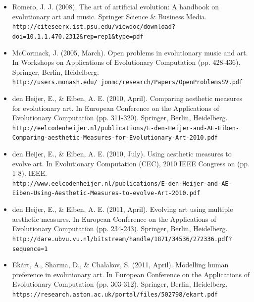 \documentclass[10pt,a4paper]{article}
\begin{document}
\begin{itemize}
	\item Romero, J. J. (2008). The art of artificial evolution: A handbook on evolutionary art and music. Springer Science \& Business Media.
	\\
	\texttt{http://citeseerx.ist.psu.edu/viewdoc/download?doi=10.1.1.470.2312\&rep=rep1\&type=pdf}
	
	\item McCormack, J. (2005, March). Open problems in evolutionary music and art. In Workshops on Applications of Evolutionary Computation (pp. 428-436). Springer, Berlin, Heidelberg.
	\\
	\texttt{http://users.monash.edu/~jonmc/research/Papers/OpenProblemsSV.pdf}
	
	\item den Heijer, E., \& Eiben, A. E. (2010, April). Comparing aesthetic measures for evolutionary art. In European Conference on the Applications of Evolutionary Computation (pp. 311-320). Springer, Berlin, Heidelberg.
	\\
	\texttt{http://eelcodenheijer.nl/publications/E-den-Heijer-and-AE-Eiben-Comparing-aesthetic-Measures-for-Evolutionary-Art-2010.pdf}
	
	\item den Heijer, E., \& Eiben, A. E. (2010, July). Using aesthetic measures to evolve art. In Evolutionary Computation (CEC), 2010 IEEE Congress on (pp. 1-8). IEEE.
	\\
	\texttt{http://www.eelcodenheijer.nl/publications/E-den-Heijer-and-AE-Eiben-Using-Aesthetic-Measures-to-evolve-Art-2010.pdf}
	
	\item den Heijer, E., \& Eiben, A. E. (2011, April). Evolving art using multiple aesthetic measures. In European Conference on the Applications of Evolutionary Computation (pp. 234-243). Springer, Berlin, Heidelberg.
	\\
	\texttt{http://dare.ubvu.vu.nl/bitstream/handle/1871/34536/272336.pdf?sequence=1}
	
	\item Ekárt, A., Sharma, D., \& Chalakov, S. (2011, April). Modelling human preference in evolutionary art. In European Conference on the Applications of Evolutionary Computation (pp. 303-312). Springer, Berlin, Heidelberg.
	\\
	\texttt{https://research.aston.ac.uk/portal/files/502798/ekart.pdf}
\end{itemize}
\end{document}
